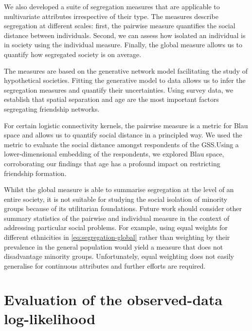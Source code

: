\documentclass{scrartcl}
\begin{document}
We also developed a suite of segregation measures that are applicable to multivariate attributes irrespective of their type. The measures describe segregation at different scales: first, the pairwise measure quantifies the social distance between individuals. Second, we can assess how isolated an individual is in society using the individual measure. Finally, the global measure allows us to quantify how segregated society is on average.

The measures are based on the generative network model facilitating the study of hypothetical societies. Fitting the generative model to data allows us to infer the segregation measures and quantify their uncertainties. Using survey data, we establish that spatial separation and age are the most important factors segregating friendship networks.

For certain logistic connectivity kernels, the pairwise measure is a metric for Blau space and allows us to quantify social distance in a principled way. We used the metric to evaluate the social distance amongst respondents of the GSS.\@ Using a lower-dimensional embedding of the respondents, we explored Blau space, corroborating our findings that age has a profound impact on restricting friendship formation.

Whilst the global measure is able to summarise segregation at the level of an entire society, it is not suitable for studying the social isolation of minority groups because of its utilitarian foundations. Future work should consider other summary statistics of the pairwise and individual measure in the context of addressing particular social problems. For example, using equal weights for different ethnicities in \cref{eq:segregation-global} rather than weighting by their prevalence in the general population would yield a measure that does not disadvantage minority groups. Unfortunately, equal weighting does not easily generalise for continuous attributes and further efforts are required.

\printbibliography

\appendix

\section{Evaluation of the observed-data log-likelihood}
\end{document}
